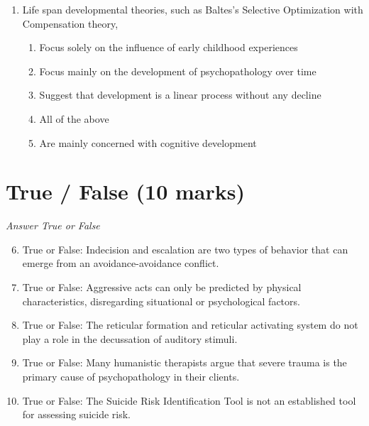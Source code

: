 \documentclass[12pt]{article}
\begin{document}
\begin{enumerate}[label=\arabic*.]
\begin{enumerate}[label=(\alph*)]
    \item positive reinforcement
    \item classical conditioning
    \item intrinsic motivation
    \item observational learning
\end{enumerate}
\item Life span developmental theories, such as Baltes's Selective Optimization with Compensation theory,
\begin{enumerate}[label=(\alph*)]
    \item Focus solely on the influence of early childhood experiences
    \item Focus mainly on the development of psychopathology over time
    \item Suggest that development is a linear process without any decline
    \item All of the above
    \item Are mainly concerned with cognitive development
\end{enumerate}
\end{enumerate}

\section*{True / False (10 marks)}
\textit{Answer True or False}
\begin{enumerate}[label=\arabic*.]
\setcounter{enumi}{5}
\item True or False: Indecision and escalation are two types of behavior that can emerge from an avoidance-avoidance conflict.
\item True or False: Aggressive acts can only be predicted by physical characteristics, disregarding situational or psychological factors.
\item True or False: The reticular formation and reticular activating system do not play a role in the decussation of auditory stimuli.
\item True or False: Many humanistic therapists argue that severe trauma is the primary cause of psychopathology in their clients.
\item True or False: The Suicide Risk Identification Tool is not an established tool for assessing suicide risk.
\end{enumerate}
\end{document}
